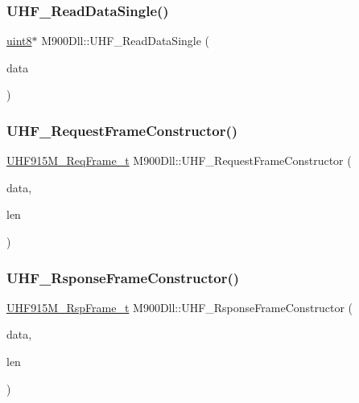 \mbox{\label{class_m900_dll_a4aeb054a9ae965ab02ea5d9bc74e5733}} 
\subsubsection{\texorpdfstring{UHF\_ReadDataSingle()}{UHF\_ReadDataSingle()}}
{\footnotesize\ttfamily \mbox{\hyperlink{m900dll_8h_adde6aaee8457bee49c2a92621fe22b79}{uint8}}$\ast$ M900\+Dll\+::\+U\+H\+F\+\_\+\+Read\+Data\+Single (\begin{DoxyParamCaption}\item[{\mbox{\hyperlink{struct_u_h_f___req_read_data__t}{U\+H\+F\+\_\+\+Req\+Read\+Data\+\_\+t}} $\ast$}]{data }\end{DoxyParamCaption})}

\mbox{\label{class_m900_dll_a0864fb5c8151d482d10996d6d1e7f3c9}} 
\subsubsection{\texorpdfstring{UHF\_RequestFrameConstructor()}{UHF\_RequestFrameConstructor()}}
{\footnotesize\ttfamily \mbox{\hyperlink{struct_u_h_f915_m___req_frame__t}{U\+H\+F915\+M\+\_\+\+Req\+Frame\+\_\+t}} M900\+Dll\+::\+U\+H\+F\+\_\+\+Request\+Frame\+Constructor (\begin{DoxyParamCaption}\item[{\mbox{\hyperlink{m900dll_8h_adde6aaee8457bee49c2a92621fe22b79}{uint8}} $\ast$}]{data,  }\item[{int}]{len }\end{DoxyParamCaption})}

\mbox{\label{class_m900_dll_a9b712270dfedfb455b2e36abddcc92a2}} 
\subsubsection{\texorpdfstring{UHF\_RsponseFrameConstructor()}{UHF\_RsponseFrameConstructor()}}
{\footnotesize\ttfamily \mbox{\hyperlink{struct_u_h_f915_m___rsp_frame__t}{U\+H\+F915\+M\+\_\+\+Rsp\+Frame\+\_\+t}} M900\+Dll\+::\+U\+H\+F\+\_\+\+Rsponse\+Frame\+Constructor (\begin{DoxyParamCaption}\item[{\mbox{\hyperlink{m900dll_8h_adde6aaee8457bee49c2a92621fe22b79}{uint8}} $\ast$}]{data,  }\item[{int}]{len }\end{DoxyParamCaption})}

